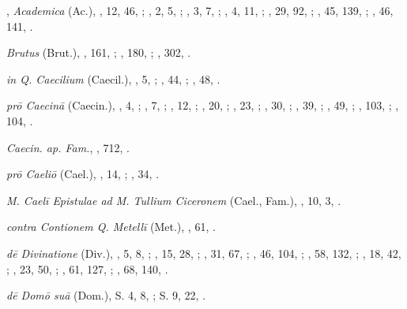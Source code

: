 \begin{autindex}
\indexspace

,
  \subitem \emph{Academica} (Ac.),
    , 12,  46, ;
    ,  2,   5, ;
    ,  3,   7, ;
    ,  4,  11, ;
    , 29,  92, ;
    , 45, 139, ;
    , 46, 141, .

  \subitem \emph{Brutus} (Brut.),
    , 161, ;
    , 180, ;
    , 302, .

  \subitem \emph{in Q. Caecilium} (Caecil.),
    ,  5, ;
    , 44, ;
    , 48, .

  \subitem \emph{prō Caecinā} (Caecin.),
    ,   4, ;
    ,   7, ;
    ,  12, ;
    ,  20, ;
    ,  23, ;
    ,  30, ;
    ,  39, ;
    ,  49, ;
    , 103, ;
    , 104, .

  \subitem \emph{Caecin. ap. Fam.},
    , 712, .

  \subitem \emph{prō Caeliō} (Cael.),
    ,  14, ;
    , 34, .

  \subitem \emph{M. Caelī Epistulae ad M. Tullium Ci\-ce\-ro\-nem}
  (Cael., Fam.),
    , 10, 3, .

  \subitem \emph{contra Contionem Q. Metellī} (Met.),
    , 61, .

  \subitem \emph{dē Divinatione} (Div.),
    ,  5,   8, ;
    , 15,  28, ;
    , 31,  67, ;
    , 46, 104, ;
    , 58, 132, ;
    , 18,  42, ;
    , 23,  50, ;
    , 61, 127, ;
    , 68, 140, .

  \subitem \emph{dē Domō suā} (Dom.),
    \subsubitem S. 4,  8, ;
    \subsubitem S. 9, 22, .

\columnbreak


\end{autindex}
